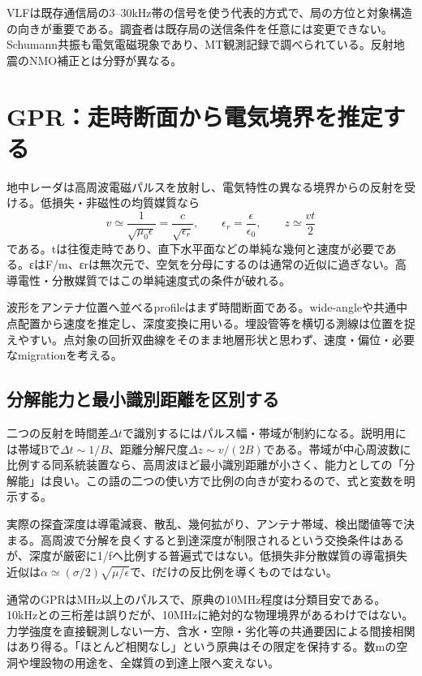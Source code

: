 VLFは既存通信局の3--30kHz帯の信号を使う代表的方式で、局の方位と対象構造の向きが重要である。調査者は既存局の送信条件を任意には変更できない。Schumann共振も電気電磁現象であり、MT観測記録で調べられている\cite{schumann_mt2009}。反射地震のNMO補正とは分野が異なる。

\section{GPR：走時断面から電気境界を推定する}
\label{theory:exploration:gpr}
地中レーダは高周波電磁パルスを放射し、電気特性の異なる境界からの反射を受ける。低損失・非磁性の均質媒質なら
\[
 v\simeq\frac{1}{\sqrt{\mu_0\epsilon}}
 =\frac{c}{\sqrt{\epsilon_r}},\qquad
 \epsilon_r=\frac{\epsilon}{\epsilon_0},\qquad
 z\simeq\frac{vt}{2}
\]
である。tは往復走時であり、直下水平面などの単純な幾何と速度が必要である。εはF/m、εrは無次元で、空気を分母にするのは通常の近似に過ぎない。高導電性・分散媒質ではこの単純速度式の条件が破れる。

波形をアンテナ位置へ並べるprofileはまず時間断面である。wide-angleや共通中点配置から速度を推定し、深度変換に用いる。埋設管等を横切る測線は位置を捉えやすい。点対象の回折双曲線をそのまま地層形状と思わず、速度・偏位・必要なmigrationを考える\cite{epa_gpr}。

\subsection*{分解能力と最小識別距離を区別する}
\label{theory:exploration:gprresolution}
二つの反射を時間差\(\Delta t\)で識別するにはパルス幅・帯域が制約になる。説明用には帯域Bで\(\Delta t\sim1/B\)、距離分解尺度\(\Delta z\sim v/(2B)\)である。帯域が中心周波数に比例する同系統装置なら、高周波ほど最小識別距離が小さく、能力としての「分解能」は良い。この語の二つの使い方で比例の向きが変わるので、式と変数を明示する。

実際の探査深度は導電減衰、散乱、幾何拡がり、アンテナ帯域、検出閾値等で決まる。高周波で分解を良くすると到達深度が制限されるという交換条件はあるが、深度が厳密に1/fへ比例する普遍式ではない。低損失非分散媒質の導電損失近似は\(\alpha\simeq(\sigma/2)\sqrt{\mu/\epsilon}\)で、fだけの反比例を導くものではない。

通常のGPRはMHz以上のパルスで、原典の10MHz程度は分類目安である。10kHzとの三桁差は誤りだが、10MHzに絶対的な物理境界があるわけではない。力学強度を直接観測しない一方、含水・空隙・劣化等の共通要因による間接相関はあり得る。「ほとんど相関なし」という原典はその限定を保持する。数mの空洞や埋設物の用途を、全媒質の到達上限へ変えない。

